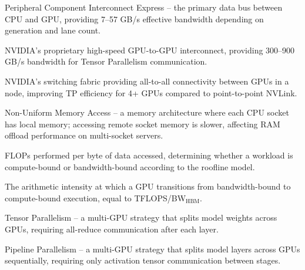 \documentclass[11pt,a4paper]{article}
\theoremstyle{definition}
\begin{document}
\begin{description}[style=nextline]
  \item[PCIe] Peripheral Component Interconnect Express -- the primary data bus between CPU and GPU, providing 7--57 GB/s effective bandwidth depending on generation and lane count.
  \item[NVLink] NVIDIA's proprietary high-speed GPU-to-GPU interconnect, providing 300--900 GB/s bandwidth for Tensor Parallelism communication.
  \item[NVSwitch] NVIDIA's switching fabric providing all-to-all connectivity between GPUs in a node, improving TP efficiency for 4+ GPUs compared to point-to-point NVLink.
  \item[NUMA] Non-Uniform Memory Access -- a memory architecture where each CPU socket has local memory; accessing remote socket memory is slower, affecting RAM offload performance on multi-socket servers.
  \item[Arithmetic Intensity] FLOPs performed per byte of data accessed, determining whether a workload is compute-bound or bandwidth-bound according to the roofline model.
  \item[Ridge Point] The arithmetic intensity at which a GPU transitions from bandwidth-bound to compute-bound execution, equal to TFLOPS/BW$_{\text{HBM}}$.
  \item[TP] Tensor Parallelism -- a multi-GPU strategy that splits model weights across GPUs, requiring all-reduce communication after each layer.
  \item[PP] Pipeline Parallelism -- a multi-GPU strategy that splits model layers across GPUs sequentially, requiring only activation tensor communication between stages.
\end{description}
\end{document}
